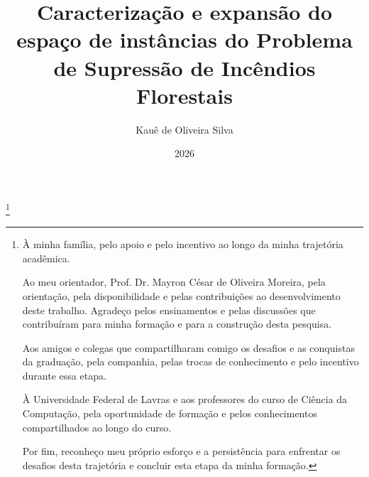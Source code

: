 \documentclass{templufla}
\author{Kauê de Oliveira Silva}
\title{Caracterização e expansão do espaço de instâncias do Problema de Supressão de Incêndios Florestais}
\date{2026}
\begin{document}

\maketitle


\thanks{À minha família, pelo apoio e pelo incentivo ao longo da minha
trajetória acadêmica.

Ao meu orientador, Prof. Dr. Mayron César de Oliveira Moreira, pela orientação,
pela disponibilidade e pelas contribuições ao desenvolvimento deste trabalho.
Agradeço pelos ensinamentos e pelas discussões que contribuíram para minha
formação e para a construção desta pesquisa.

Aos amigos e colegas que compartilharam comigo os desafios e as conquistas da
graduação, pela companhia, pelas trocas de conhecimento e pelo incentivo
durante essa etapa.

À Universidade Federal de Lavras e aos professores do curso de Ciência da
Computação, pela oportunidade de formação e pelos conhecimentos compartilhados
ao longo do curso.

Por fim, reconheço meu próprio esforço e a persistência para enfrentar os
desafios desta trajetória e concluir esta etapa da minha formação.}

\end{document}
